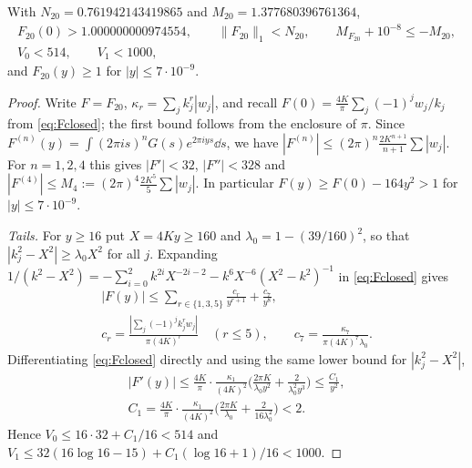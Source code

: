 \documentclass[11pt,colorlinks]{charlie}
\begin{document}
\begin{lemma}\label{lem:twenty}
With $N_{20}=0.761942143419865$ and $M_{20}=1.377680396761364$,
\begin{gather*}
 F_{20}(0)>1.000000000974554,\qquad\|F_{20}\|_1<N_{20},\qquad M_{F_{20}}+10^{-8}\le-M_{20},\\
 V_0<514,\qquad V_1<1000,
\end{gather*}
and $F_{20}(y)\ge1$ for $|y|\le7\cdot10^{-9}$.
\end{lemma}
\begin{proof}
Write $F=F_{20}$, $\kappa_r=\sum_jk_j^r|w_j|$, and recall $F(0)=\frac{4K}\pi\sum_j(-1)^jw_j/k_j$ from \eqref{eq:Fclosed}; the first bound follows from the enclosure of $\pi$. Since $F^{(n)}(y)=\int(2\pi is)^nG(s)e^{2\pi iys}\dd s$, we have $|F^{(n)}|\le(2\pi)^n\frac{2K^{n+1}}{n+1}\sum|w_j|$. For $n=1,2,4$ this gives $|F'|<32$, $|F''|<328$ and $|F^{(4)}|\le M_4:=(2\pi)^4\frac{2K^5}5\sum|w_j|$. In particular $F(y)\ge F(0)-164y^2>1$ for $|y|\le7\cdot10^{-9}$.

\emph{Tails.} For $y\ge16$ put $X=4Ky\ge160$ and $\lambda_0=1-(39/160)^2$, so that $|k_j^2-X^2|\ge\lambda_0X^2$ for all $j$. Expanding $1/(k^2-X^2)=-\sum_{i=0}^2k^{2i}X^{-2i-2}-k^6X^{-6}(X^2-k^2)^{-1}$ in \eqref{eq:Fclosed} gives
\begin{gather*}
 |F(y)|\le\sum_{r\in\{1,3,5\}}\frac{c_r}{y^{r+1}}+\frac{c_7}{y^8},\\
 c_r=\frac{|\sum_j(-1)^jk_j^rw_j|}{\pi(4K)^r}\quad(r\le5),\qquad c_7=\frac{\kappa_7}{\pi(4K)^7\lambda_0}.
\end{gather*}
Differentiating \eqref{eq:Fclosed} directly and using the same lower bound for $|k_j^2-X^2|$,
\begin{gather*}
 |F'(y)|\le\frac{4K}\pi\cdot\frac{\kappa_1}{(4K)^2}\Big(\frac{2\pi K}{\lambda_0y^2}+\frac2{\lambda_0^2y^3}\Big)\le\frac{C_1}{y^2},\\
 C_1=\frac{4K}\pi\cdot\frac{\kappa_1}{(4K)^2}\Big(\frac{2\pi K}{\lambda_0}+\frac2{16\lambda_0^2}\Big)<2 .
\end{gather*}
Hence $V_0\le16\cdot32+C_1/16<514$ and $V_1\le32(16\log16-15)+C_1(\log16+1)/16<1000$.


\end{proof}
\end{document}
